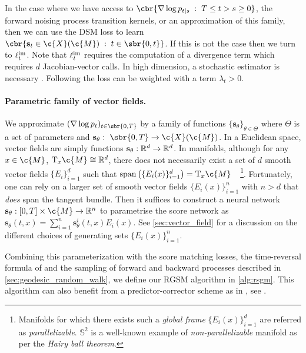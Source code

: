 In the case where we have access to $\cbr{\nabla \log p_{t|s}\;:\;T \le t > s \ge 0}$, the forward noising process transition kernels, or an approximation of this family, then we can use the DSM loss to learn $\cbr{\mathbf{s}_t \in \c{X}(\c{M}) \;:\;t \in \sbr{0,t}}$.
If this is not the case then we turn to $\ell^{\textup{im}}_t$.
Note that $\ell^{\textup{im}}_t$ requires the computation of a divergence term which requires $d$ Jacobian-vector calls.
In high dimension, a stochastic estimator is necessary \parencite{hutchinson1989stochastic}.
Following \textcite{song2020improved, nichol2021improved} the loss can be weighted with a term $\lambda_t > 0$.

\paragraph{Parametric family of vector fields.}
We approximate $(\nabla \log p_t)_{t \in \sbr{0,T}}$ by a family of functions $\{\mathbf{s}_\theta\}_{\theta \in \Theta}$ where $\Theta$ is a set of parameters and $\mathbf{s}_\theta: \ \sbr{0,T} \to \c{X}(\c{M})$.
In a Euclidean space, vector fields are simply functions $\mathbf{s}_\theta: \mathbb{R}^d \rightarrow \mathbb{R}^d$.
In manifolds, although for any $x \in \c{M}$, $\mathrm{T}_x\c{M} \cong \R^d$, there does not necessarily exist a set of $d$ smooth vector fields $\{E_i\}_{i=1}^d$ such that $\text{span}\left( \{E_i(x)\}_{i=1}^d \right) = \mathrm{T}_x\c{M}$~\parencite[Chapter 8, page 179,][]{lee2006riemannian}~\footnote{Manifolds for which there exists such a \emph{global frame} $\{E_i(x)\}_{i=1}^d$ are referred as \emph{parallelizable}.
$\mathbb{S}^2$ is a well-known example of
\emph{non-parallelizable} manifold as per the \emph{Hairy ball theorem}.}.
Fortunately, one can rely on a larger set of smooth vector fields $\{E_i(x)\}_{i=1}^n$ with $n > d$ that \emph{does} span the tangent bundle.
Then it suffices to construct a neural network $\mathbf{s}_\theta: [0, T] \times \c{M} \rightarrow \R^n$ to parametrise the score network as $\mathbf{s}_\theta(t,x) = \sum_{i=1}^n \mathbf{s}^i_\theta(t,x) E_i(x)$.
See \cref{sec:vector_field} for a discussion on the different choices of generating sets $\{E_i(x)\}_{i=1}^n$.

Combining this parameterization with the score matching losses, the time-reversal formula of  and the sampling of forward and backward processes described in \cref{sec:geodesic_random_walk}, we define our RGSM algorithm in \cref{alg:rsgm}.
This algorithm can also benefit from a predictor-corrector scheme as in \textcite{song2020score}, see .


